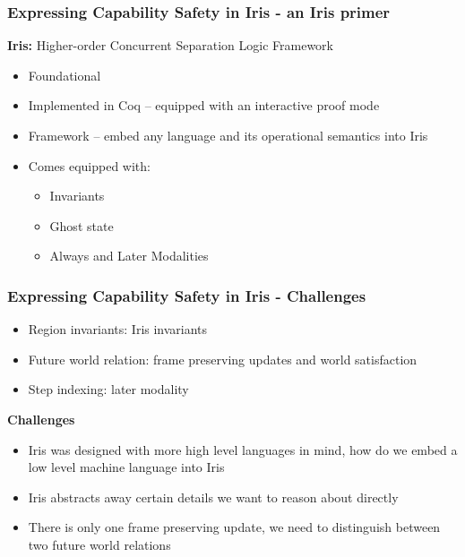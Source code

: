 \documentclass{beamer}
\begin{document}
\begin{frame}
\frametitle{Expressing Capability Safety in Iris - an Iris primer}

\textbf{Iris:} Higher-order Concurrent Separation Logic Framework
\begin{itemize}
	\item<2-> Foundational
	\item<3-> Implemented in Coq -- equipped with an interactive proof mode
	\item<4-> Framework -- embed any language and its operational semantics into Iris
	\item<5-> Comes equipped with: 
		\begin{itemize}
			\item<5-> Invariants
			\item<6-> Ghost state
			\item<7-> Always and Later Modalities
		\end{itemize}
\end{itemize}


\end{frame}

\begin{frame}
\frametitle{Expressing Capability Safety in Iris - Challenges}

\begin{itemize}
	\item Region invariants: Iris invariants
	\item Future world relation: frame preserving updates and world satisfaction 
	\item Step indexing: later modality
\end{itemize}

\textbf{Challenges}
\begin{itemize}
	\item<2-> Iris was designed with more high level languages in mind, how do we embed a low level machine language into Iris
	\item<3-> Iris abstracts away certain details we want to reason about directly
	\item<4-> There is only one frame preserving update, we need to distinguish between two future world relations
\end{itemize}

\end{frame}
\end{document}

